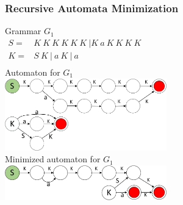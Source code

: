 \documentclass{beamer}
\begin{document}
	\begin{frame} 
		\frametitle{Recursive Automata Minimization}
		\vspace{-12pt}
		\begin{center}
			{Grammar $G_1$\\
			\vspace{5pt}
			$
			\begin{array}{rl}
			S =& K\ K\ K\ K\ K\ K \ |K\ a\ K\ K\ K\ K \\
			K =& S\ K\ |\ a\ K\ |\ a \\
			\end{array}
			$
			}
		    \\
		    \vspace{12pt}
		    Automaton for $G_1$
		    \\
		    \vspace{5pt}
		    {
				\includegraphics[width=7cm]{pictures/G1initial.pdf}
			}\\
			\vspace{8pt}
			Minimized automaton for $G_1$
			\\
			\vspace{5pt}
		    {
				\includegraphics[width=7cm]{pictures/G1automaton.pdf}
			}
		\end{center}
	\end{frame}
	
\end{document}
